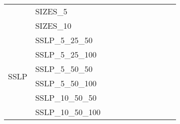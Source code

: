 \begin{table}[]
{\begin{tabular}{|c|l|lll|lll|l|l|l|}
			& SIZES\_5                      &                                   &                                 &             &                           &                         &      &                                         &                                 &                                \\
			& SIZES\_10                     &                                   &                                 &             &                           &                         &      &                                         &                                 &                                \\ \hline
			\multirow{8}{*}{SSLP}    & SSLP\_5\_25\_50               &                                   &                                 &             &                           &                         &      &                                         &                                 &                                \\
			& SSLP\_5\_25\_100              &                                   &                                 &             &                           &                         &      &                                         &                                 &                                \\
			& SSLP\_5\_50\_50               &                                   &                                 &             &                           &                         &      &                                         &                                 &                                \\
			& SSLP\_5\_50\_100              &                                   &                                 &             &                           &                         &      &                                         &                                 &                                \\
			& SSLP\_10\_50\_50              &                                   &                                 &             &                           &                         &      &                                         &                                 &                                \\
			& SSLP\_10\_50\_100             &                                   &                                 &             &                           &                         &      &                                         &                                 &                                \\

\end{tabular}}
\end{table}
